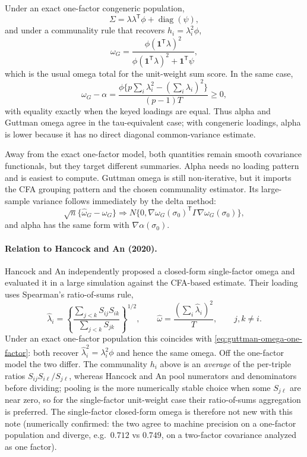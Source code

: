 \documentclass[11pt]{article}
\newcommand{\T}{^{\mathsf T}}
\newcommand{\diag}{\operatorname{diag}}
\theoremstyle{plain}
\theoremstyle{remark}
\begin{document}
Under an exact one-factor congeneric population,
\[
  \Sigma=\lambda\lambda\T\phi+\diag(\psi),
\]
and under a communality rule that recovers \(h_i=\lambda_i^2\phi\),
\[
  \omega_G
    =
  \frac{\phi(\mathbf{1}\T\lambda)^2}
       {\phi(\mathbf{1}\T\lambda)^2+\mathbf{1}\T\psi},
\]
which is the usual omega total for the unit-weight sum score. In the same
case,
\[
  \omega_G-\alpha
    =
  \frac{
    \phi\{p\sum_i\lambda_i^2-(\sum_i\lambda_i)^2\}
  }{
    (p-1)T
  }
  \ge 0,
\]
with equality exactly when the keyed loadings are equal. Thus alpha and
Guttman omega agree in the tau-equivalent case; with congeneric loadings,
alpha is lower because it has no direct diagonal common-variance estimate.

Away from the exact one-factor model, both quantities remain smooth covariance
functionals, but they target different summaries. Alpha needs no loading
pattern and is easiest to compute. Guttman omega is still non-iterative, but it
imports the CFA grouping pattern and the chosen communality estimator. Its
large-sample variance follows immediately by the delta method:
\[
  \sqrt n\{\hat\omega_G-\omega_G\}
    \Rightarrow
  N\{0,\nabla\omega_G(\sigma_0)\T\Gamma\nabla\omega_G(\sigma_0)\},
\]
and alpha has the same form with \(\nabla\alpha(\sigma_0)\).

\paragraph{Relation to Hancock and An (2020).}
Hancock and An \cite{hancockan2020} independently proposed a closed-form
single-factor omega and evaluated it in a large simulation against the CFA-based
estimate. Their loading uses Spearman's \cite{spearman1927} ratio-of-sums rule,
\[
  \hat\lambda_i
    =
  \left\{
    \frac{\sum_{j<k}S_{ij}S_{ik}}{\sum_{j<k}S_{jk}}
  \right\}^{1/2},
  \qquad
  \hat\omega=\frac{(\sum_i\hat\lambda_i)^2}{T},
  \qquad j,k\ne i.
\]
Under an exact one-factor population this coincides with
\eqref{eq:guttman-omega-one-factor}: both recover \(\hat\lambda_i^2=\lambda_i^2\phi\)
and hence the same omega. Off the one-factor model the two differ. The communality
\(h_i\) above is an \emph{average} of the per-triple ratios
\(S_{ij}S_{i\ell}/S_{j\ell}\), whereas Hancock and An pool numerators and
denominators before dividing; pooling is the more numerically stable choice when
some \(S_{j\ell}\) are near zero, so for the single-factor unit-weight case their
ratio-of-sums aggregation is preferred. The single-factor closed-form omega is
therefore not new with this note (numerically confirmed: the two agree to machine
precision on a one-factor population and diverge, e.g.\ \(0.712\) vs \(0.749\), on a
two-factor covariance analyzed as one factor).
\end{document}

